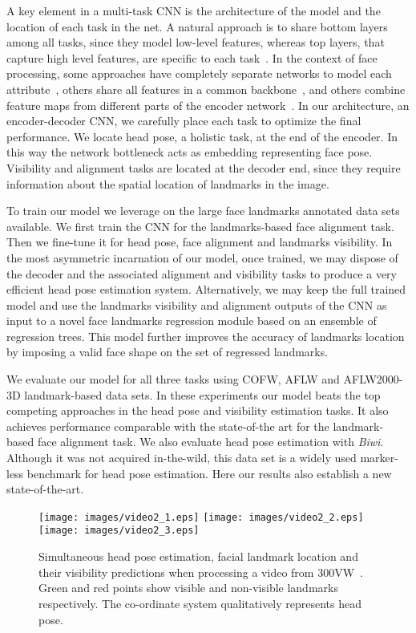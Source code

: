 \documentclass[9pt,technote,compsoc]{IEEEtran}
\begin{document}
A key element in a multi-task CNN is the architecture of the model and the location of each task in the net. A natural approach is to share bottom layers among all tasks, since they model low-level features, whereas top layers, that capture high level features, are specific to each task~\cite{Kokkinos17}. In the context of face processing, some approaches have completely separate networks to model each attribute~\cite{Chang19}, others share all features in a common backbone~\cite{Han18}, and others combine feature maps from different parts of the encoder network~\cite{Ranjan19}. In our architecture, an encoder-decoder CNN, we carefully place each task to optimize the final performance. We locate head pose, a holistic task, at the end of the encoder. In this way the network bottleneck acts as embedding representing face pose. Visibility and alignment tasks are located at the decoder end, since they require information about the spatial location of landmarks in the image.

To train our model we leverage on the large face landmarks annotated data sets available. We first train the CNN for the landmarks-based face alignment task. Then we fine-tune it for head pose, face alignment and landmarks visibility. In the most asymmetric incarnation of our model, once trained, we may dispose of the decoder and the associated alignment and visibility tasks to produce a very efficient head pose estimation system. 
Alternatively, we may keep the full trained model and use the landmarks visibility and alignment outputs of the CNN as input to a novel face landmarks regression module based on an ensemble of regression trees. This model further improves the accuracy of landmarks location by imposing a valid face shape on the set of regressed landmarks.


We evaluate our model for all three tasks using COFW, AFLW and AFLW2000-3D landmark-based data sets. In these experiments our model beats the top competing approaches in the head pose and visibility estimation tasks. It also achieves performance comparable with the state-of-the art for the landmark-based face alignment task. We also evaluate head pose estimation with \emph{Biwi}. Although it was not acquired in-the-wild, this data set is a widely used marker-less benchmark for head pose estimation. Here our results also establish a new state-of-the-art. 

\begin{figure*}
  \centering
\texttt{[image: images/video2\_1.eps]}
  \texttt{[image: images/video2\_2.eps]}
  \texttt{[image: images/video2\_3.eps]}
  \caption{Simultaneous head pose estimation, facial landmark location and their visibility predictions when processing a video from 300VW~\cite{Shen15}. Green and red points show visible and non-visible landmarks respectively. The co-ordinate system qualitatively represents head pose.}
  \label{fig:multitask_video}
\end{figure*}
\end{document}
